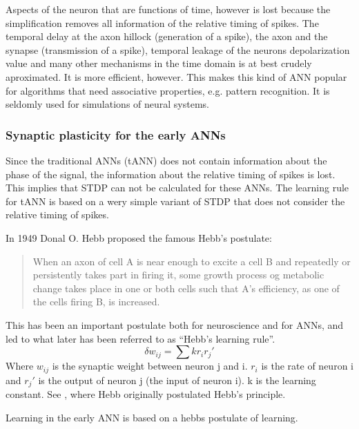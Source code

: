 Aspects of the neuron that are functions of time, however is lost because the simplification removes all information of the relative timing of spikes.
The temporal delay at the axon hillock (generation of a spike), the axon and the synapse (transmission of a spike), temporal leakage of the neurons depolarization value and many other mechanisms in the time domain is at best crudely aproximated.
It is more efficient, however. This makes this kind of ANN popular for algorithms that need associative properties, e.g. pattern recognition. It is seldomly used for simulations of neural systems.


		\subsubsection{Synaptic plasticity for the early ANNs}
Since the traditional ANNs (tANN) does not contain information about the phase of the signal, the information about the relative timing of spikes is lost. This implies that STDP can not be calculated for these ANNs. 
The learning rule for tANN is based on a wery simple variant of STDP that does not consider the relative timing of spikes.

In 1949 Donal O. Hebb proposed the famous Hebb's postulate:
\begin{quote}
When an axon of cell A is near enough to excite a cell B and repeatedly or persistently takes part in firing it, some growth process og metabolic change takes place in one or both cells such that A's efficiency, as one of the cells firing B, is increased.\cite{Hebb1949Kap4}
\end{quote}

This has been an important postulate both for neuroscience and for ANNs, and led to what later has been referred to as ``Hebb's learning rule''.
\begin{equation}
	\delta w_{ij} = \sum{k r_i r_j'}
\end{equation}
Where $w_{ij}$ is the synaptic weight between neuron j and i. $r_i$ is the rate of neuron i and $r_j'$ is the output of neuron j (the input of neuron i). \mbox{k} is the learning constant. See \cite{Hebb1949Kap4}, where Hebb originally postulated Hebb's principle.

Learning in the early ANN is based on a hebbs postulate of learning. %

